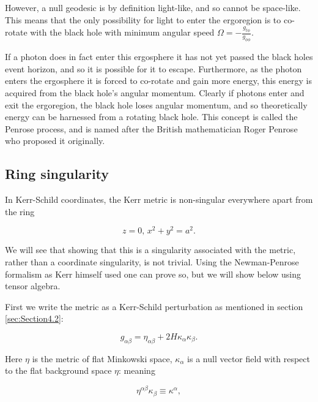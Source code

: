 \documentclass[oneside,openright,frontopenright, singlespacing]{dmathesis}
\begin{document}
\vspace{1em}
	However, a null geodesic is by definition light-like, and so cannot be space-like. This means that the only possibility for light to enter the ergoregion is to co-rotate with the black hole with minimum angular speed $\Omega=-\frac{g_{t\phi}}{g_{\phi\phi}}$.

\vspace{1em}
	If a photon does in fact enter this ergosphere it has not yet passed the black holes event horizon, and so it is possible for it to escape. Furthermore, as the photon enters the ergosphere it is forced to co-rotate and gain more energy, this energy is acquired from the black hole's angular momentum. Clearly if photons enter and exit the ergoregion, the black hole loses angular momentum, and so theoretically energy can be harnessed from a rotating black hole. This concept is called the Penrose process\cite{penrose1971extraction}, and is named after the British mathematician Roger Penrose who proposed it originally.

\subsection{Ring singularity}\label{subsec:Subsection4.3.3}

\vspace{1em}
	In Kerr-Schild coordinates, the Kerr metric is non-singular everywhere apart from the ring

	\[z=0\mbox{, } x^2+y^2=a^2.\]

\vspace{1em}
	We will see that showing that this is a singularity associated with the metric, rather than a coordinate singularity, is not trivial. Using the Newman-Penrose formalism as Kerr himself used\cite{kerr2008discovering} one can prove so, but we will show below using tensor algebra. 

\vspace{1em}
	First we write the metric as a Kerr-Schild perturbation as mentioned in section \ref{sec:Section4.2}:

	\[g_{\alpha\beta} = \eta_{\alpha\beta} + 2H\kappa_\alpha\kappa_\beta.\]

\vspace{1em}
	Here $\eta$ is the metric of flat Minkowski space, $\kappa_\alpha$ is a null vector field with respect to the flat background space $\eta$: meaning

	\[\eta^{\alpha\beta}\kappa_\beta\equiv\kappa^\alpha,\]
\end{document}
